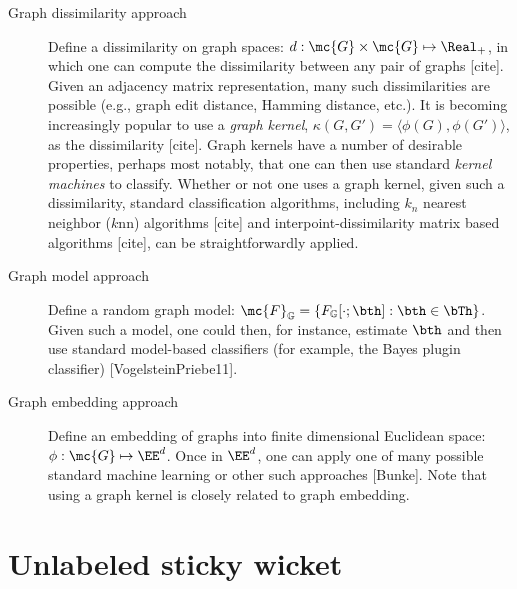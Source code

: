 
\begin{description}
	\item[Graph dissimilarity approach] Define a dissimilarity on graph spaces: $d: \mc{G} \times \mc{G} \mapsto \Real_+$, in which one can compute the dissimilarity between any pair of graphs [cite]. Given an adjacency matrix representation, many such dissimilarities are possible (e.g., graph edit distance, Hamming distance, etc.).  It is becoming increasingly popular to use a \emph{graph kernel}, $\kappa(G,G')=\langle \phi(G), \phi(G') \rangle$, as the dissimilarity [cite].  Graph kernels have a number of desirable properties, perhaps most notably, that one can then use standard \emph{kernel machines} to classify.	Whether or not one uses a graph kernel, given such a dissimilarity, standard classification algorithms, including $k_n$ nearest neighbor ($k$nn) algorithms [cite] and interpoint-dissimilarity matrix based algorithms [cite], can be straightforwardly applied.  
	\item[Graph model approach] Define a random graph model: $\mc{F}_{\GG} = \{F_{\GG}[\cdot; \bth] : \bth \in \bTh\}$.  Given such a model, one could then, for instance, estimate $\bth$ and then use standard model-based classifiers (for example, the Bayes plugin classifier) [VogelsteinPriebe11]. 
	\item[Graph embedding approach] Define an embedding of graphs into finite dimensional Euclidean space: $\phi: \mc{G} \mapsto \EE^d$.  Once in $\EE^d$, one can apply one of many possible standard machine learning or other such approaches [Bunke]. Note that using a graph kernel is closely related to graph embedding.
\end{description}



\section{Unlabeled sticky wicket}

